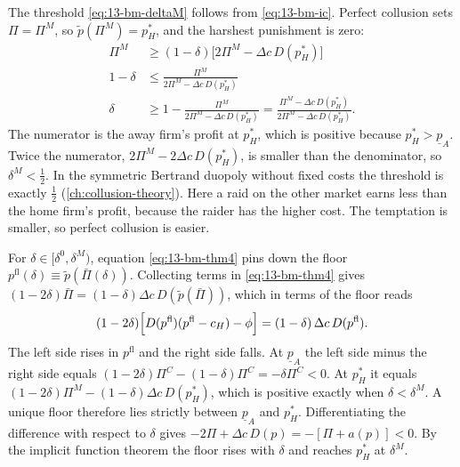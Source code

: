 The threshold \eqref{eq:13-bm-deltaM} follows from \eqref{eq:13-bm-ic}. Perfect collusion sets $\Pi=\Pi^M$,
so $\tilde p(\Pi^M)=p_H^*$, and the harshest punishment is zero:
\begin{align*}
\Pi^M&\ge(1-\delta)\bigl[2\Pi^M-\Delta c\,D(p_H^*)\bigr]\\
1-\delta&\le\frac{\Pi^M}{2\Pi^M-\Delta c\,D(p_H^*)}\\
\delta&\ge1-\frac{\Pi^M}{2\Pi^M-\Delta c\,D(p_H^*)}=\frac{\Pi^M-\Delta c\,D(p_H^*)}{2\Pi^M-\Delta c\,D(p_H^*)} .
\end{align*}
The numerator is the away firm's profit at $p_H^*$, which is positive because $p_H^*>\underline p_A$. Twice the
numerator, $2\Pi^M-2\Delta c\,D(p_H^*)$, is smaller than the denominator, so $\delta^M<\frac{1}{2}$. In the
symmetric Bertrand duopoly without fixed costs the threshold is exactly $\frac{1}{2}$ (\cref{ch:collusion-theory}).
Here a raid on the other market earns less than the home firm's profit, because the raider has the higher
cost. The temptation is smaller, so perfect collusion is easier.

For $\delta\in[\delta^0,\delta^M)$, equation \eqref{eq:13-bm-thm4} pins down the floor
$p^{\mathrm{fl}}(\delta)\equiv\tilde p(\bar\Pi(\delta))$. Collecting terms in \eqref{eq:13-bm-thm4} gives
$(1-2\delta)\bar\Pi=(1-\delta)\Delta c\,D(\tilde p(\bar\Pi))$, which in terms of the floor reads
\begin{equation}\label{eq:13-bm-floor}
(1-2\delta)\Bigl[D(p^{\mathrm{fl}})(p^{\mathrm{fl}}-c_H)-\phi\Bigr]=(1-\delta)\,\Delta c\,D(p^{\mathrm{fl}}) .
\end{equation}
The left side rises in $p^{\mathrm{fl}}$ and the right side falls. At $\underline p_A$ the left side minus the
right side equals $(1-2\delta)\Pi^C-(1-\delta)\Pi^C=-\delta\Pi^C<0$. At $p_H^*$ it equals
$(1-2\delta)\Pi^M-(1-\delta)\Delta c\,D(p_H^*)$, which is positive exactly when $\delta<\delta^M$. A unique
floor therefore lies strictly between $\underline p_A$ and $p_H^*$. Differentiating the difference with
respect to $\delta$ gives $-2\Pi+\Delta c\,D(p)=-[\Pi+a(p)]<0$. By the implicit function theorem the floor
rises with $\delta$ and reaches $p_H^*$ at $\delta^M$.

